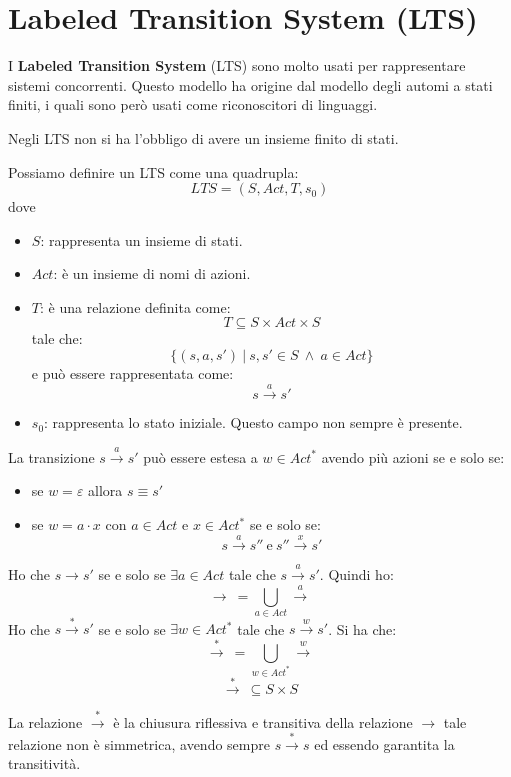 \section{Labeled Transition System (LTS)}
I \textbf{Labeled Transition System} (LTS) sono molto usati per rappresentare
sistemi concorrenti. Questo modello ha origine dal modello degli automi a stati
finiti, i quali sono però usati come riconoscitori di linguaggi.

Negli LTS non si ha l'obbligo di avere un insieme finito di stati.
\begin{definizione}
    Possiamo definire un LTS come una quadrupla: $$LTS = (S, Act, T, s_0)$$ dove
    \begin{itemize}
        \item \textbf{$S$}: rappresenta un insieme di stati.
        \item \textbf{$Act$}: è un insieme di nomi di azioni.
        \item \textbf{$T$}: è una relazione definita come: $$T \subseteq S \times Act \times S$$
              tale che: $$\{(s, a, s') \ | \ s, s' \in S \ \land \ a \in Act \}$$ e può
              essere rappresentata come: $$s \xrightarrow{a} s'$$
        \item \textbf{$s_0$}: rappresenta lo stato iniziale. Questo campo non
              sempre è presente.
    \end{itemize}
\end{definizione}

La transizione $s \xrightarrow{a} s'$ può essere estesa a $w \in Act^{\ast}$
avendo più azioni se e solo se:
\begin{itemize}
    \item se $w = \varepsilon$ allora $s \equiv s'$
    \item se $w = a \cdot x$ con $a \in Act$ e $x \in Act^{\ast}$ se e solo se:
          $$s \xrightarrow{a} s'' \ \text{e} \ s'' \xrightarrow{x} s'$$
\end{itemize}

Ho che $s \rightarrow s'$ se e solo se $\exists a \in Act$  tale che
$s \xrightarrow{a} s'$. Quindi ho: $$\rightarrow \ = \bigcup_{a \in Act} \xrightarrow{a}$$
Ho che $s \xrightarrow{\ast} s'$ se e solo se $\exists w \in Act^{\ast}$ tale
che $s \xrightarrow{w} s'$. Si ha che:
$$\xrightarrow{\ast} \ = \bigcup_{w \in Act^{\ast}} \xrightarrow{w}$$
$$\xrightarrow{\ast} \ \subseteq S \times S$$

La relazione $\xrightarrow{\ast}$ è la chiusura riflessiva e transitiva della
relazione $\rightarrow$ tale relazione non è simmetrica, avendo sempre
$s \xrightarrow{\ast} s$ ed essendo garantita la transitività.
